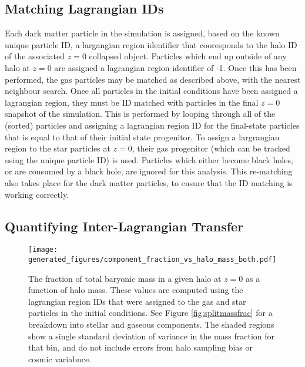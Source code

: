 
\subsection{Matching Lagrangian IDs}

Each dark matter particle in the simulation is assigned, based on the known unique particle ID, a largangian region identifier that cooresponds to the halo ID of the associated $z=0$ collapsed object. Particles which end up outside of any halo at $z=0$ are assigned a lagrangian region identifier of -1. Once this has been performed, the gas particles may be matched as described above, with the nearest neighbour search. Once all particles in the initial conditions have been assigned a lagrangian region, they must be ID matched with particles in the final $z=0$ snapshot of the simulation. This is performed by looping through all of the (sorted) particles and assigning a lagrangian region ID for the final-state particles that is equal to that of their initial state progenitor. To assign a largrangian region to the star particles at $z=0$, their gas progenitor (which can be tracked using the unique particle ID) is used. Particles which either become black holes, or are consumed by a black hole, are ignored for this analysis. This re-matching also takes place for the dark matter particles, to ensure that the ID matching is working correctly.


\subsection{Quantifying Inter-Lagrangian Transfer}

\begin{figure}
    \centering
    \texttt{[image: generated\_figures/component\_fraction\_vs\_halo\_mass\_both.pdf]}
    \caption{The fraction of total baryonic mass in a given halo at $z=0$ as a function of halo mass. These values are computed using the lagrangian region IDs that were assigned to the gas and star particles in the initial conditions. See Figure \ref{fig:splitmassfrac} for a breakdown into stellar and gaseous components. The shaded regions show a single standard deviation of variance in the mass fraction for that bin, and do not include errors from halo sampling bias or cosmic variabnce. }
    \label{fig:massfrac}
\end{figure}

